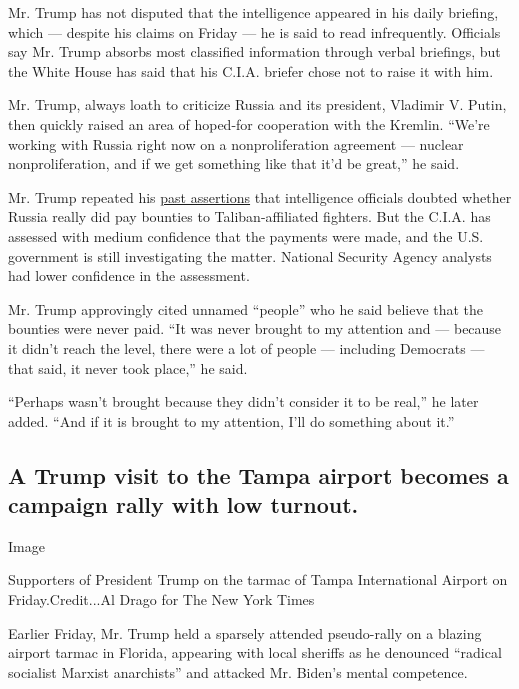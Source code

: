 Mr. Trump has not disputed that the intelligence appeared in his daily
briefing, which --- despite his claims on Friday --- he is said to read
infrequently. Officials say Mr. Trump absorbs most classified
information through verbal briefings, but the White House has said that
his C.I.A. briefer chose not to raise it with him.

Mr. Trump, always loath to criticize Russia and its president, Vladimir
V. Putin, then quickly raised an area of hoped-for cooperation with the
Kremlin. ``We're working with Russia right now on a nonproliferation
agreement --- nuclear nonproliferation, and if we get something like
that it'd be great,'' he said.

Mr. Trump repeated his
\href{https://www.nytimes.com/2020/07/29/us/politics/trump-putin-bounties.html}{past
assertions} that intelligence officials doubted whether Russia really
did pay bounties to Taliban-affiliated fighters. But the C.I.A. has
assessed with medium confidence that the payments were made, and the
U.S. government is still investigating the matter. National Security
Agency analysts had lower confidence in the assessment.

Mr. Trump approvingly cited unnamed ``people'' who he said believe that
the bounties were never paid. ``It was never brought to my attention and
--- because it didn't reach the level, there were a lot of people ---
including Democrats --- that said, it never took place,'' he said.

``Perhaps wasn't brought because they didn't consider it to be real,''
he later added. ``And if it is brought to my attention, I'll do
something about it.''

\hypertarget{a-trump-visit-to-the-tampa-airport-becomes-a-campaign-rally-with-low-turnout}{%
\subsection{A Trump visit to the Tampa airport becomes a campaign rally
with low
turnout.}\label{a-trump-visit-to-the-tampa-airport-becomes-a-campaign-rally-with-low-turnout}}

Image

Supporters of President Trump on the tarmac of Tampa International
Airport on Friday.Credit...Al Drago for The New York Times

Earlier Friday, Mr. Trump held a sparsely attended pseudo-rally on a
blazing airport tarmac in Florida, appearing with local sheriffs as he
denounced ``radical socialist Marxist anarchists'' and attacked Mr.
Biden's mental competence.

